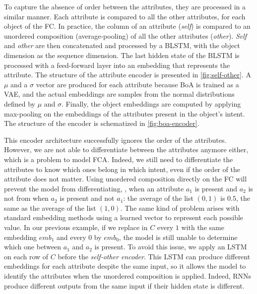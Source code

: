 To capture the absence of order between the attributes, they are processed in a similar manner.
Each attribute is compared to all the other attributes, for each object of the FC.
In practice, the column of an attribute (\emph{self}) is compared to an unordered composition (average-pooling) of all the other attributes (\emph{other}).
\emph{Self} and \emph{other} are then concatenated and processed by a BLSTM, with the object dimension as the sequence dimension.
The last hidden state of the BLSTM is processed with a feed-forward layer into an embedding that represents the attribute.
The structure of the attribute encoder is presented in \cref{fig:self-other}.
A $\mu$ and a $\sigma$ vector are produced for each attribute because BoA is trained as a VAE, and the actual embeddings are samples from the normal distributions defined by $\mu$ and $\sigma$.
Finally, the object embeddings are computed by applying max-pooling on the embeddings of the attributes present in the object's intent.
The structure of the encoder is schematized in \cref{fig:boa-encoder}.

This encoder architecture successfully ignores the order of the attributes.
However, we are not able to differentiate between the attributes anymore either, which is a problem to model FCA.
Indeed, we still need to differentiate the attributes to know which ones belong in which intent, even if the order of the attribute does not matter.
Using unordered composition directly on the FC will prevent the model from differentiating, \eg, when an attribute $a_1$ is present and $a_2$ is not from when $a_2$ is present and not $a_1$:
the average of the list $(0, 1)$ is $0.5$, the same as the average of the list $(1, 0)$.
The same kind of problem arises with standard embedding methods using a learned vector to represent each possible value.
In our previous example, if we replace in $C$ every $1$ with the same embedding $emb_1$ and every $0$ by $emb_0$, the model is still unable to determine which one between $a_1$ and $a_2$ is present.
To avoid this issue, we apply an LSTM on each row of $C$ before the \textit{self-other encoder}.
This LSTM can produce different embeddings for each attribute despite the same input, so it allows the model to identify the attributes when the unordered composition is applied.
Indeed, RNNs produce different outputs from the same input if their hidden state is different.

